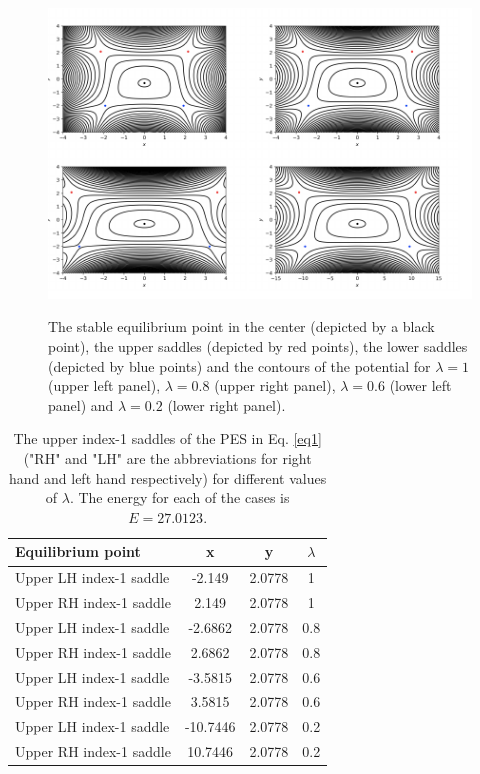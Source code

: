 \documentclass[a4paper,10pt]{article}
\begin{document}
 



\begin{figure}[htbp]
\begin{center}
\includegraphics[scale=0.8]{equi-combo.png}\\
\end{center}
\caption{The stable equilibrium point in the center (depicted by a black point), the upper saddles (depicted by red points), the lower saddles (depicted by blue points) and the  contours of the potential for $\lambda = 1$ (upper left panel), $\lambda = 0.8$ (upper right panel), $\lambda = 0.6$ (lower left panel) and  $\lambda = 0.2$ (lower right panel).}
\label{equi}
\end{figure}

\begin{table}[htbp]   
	\begin{center} 
   \begin{tabular}{| l c c c |}
          \hline
          Equilibrium point & x & y & $\lambda$ \\
          \hline
          Upper LH index-1 saddle  &-2.149   & 2.0778 & 1 \\
          Upper RH index-1 saddle  &2.149    &  2.0778 & 1\\
          Upper LH index-1 saddle  &-2.6862  & 2.0778 & 0.8 \\
          Upper RH index-1 saddle  &2.6862  &  2.0778 & 0.8\\
          Upper LH index-1 saddle  &-3.5815  & 2.0778 & 0.6 \\
          Upper RH index-1 saddle  &3.5815  &  2.0778 & 0.6 \\
          Upper LH index-1 saddle  &-10.7446 & 2.0778 & 0.2 \\
          Upper RH index-1 saddle  &10.7446 &  2.0778 & 0.2 \\
          \hline
 \end{tabular} 
\end{center} \label{tab:ta08}
\caption{The upper index-1 saddles of the PES in Eq. \ref{eq1} ("RH" and "LH" are the abbreviations for right hand and left hand respectively) for different values of $\lambda$. The energy for each of the cases is $E = 27.0123$.} 
\end{table}
 
\end{document}
